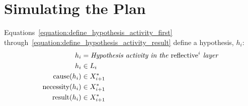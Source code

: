 \section{Simulating the Plan}

Equations~\ref{equation:define_hypothesis_activity_first}
through~\ref{equation:define_hypothesis_activity_result} define a
hypothesis, $h_i$:
\begin{align}
\label{equation:define_hypothesis_activity_first}
                  h_i &= \text{\emph{Hypothesis activity in the} reflective}^i\text{\emph{ layer}} \\
                  h_i &\in L_i \\
\label{equation:define_hypothesis_activity_cause}
    \text{cause}(h_i) &\in X^*_{i+1} \\
\label{equation:define_hypothesis_activity_necessity}
\text{necessity}(h_i) &\in X^*_{i+1} \\
\label{equation:define_hypothesis_activity_result}
   \text{result}(h_i) &\in X^*_{i+1}
\end{align}

